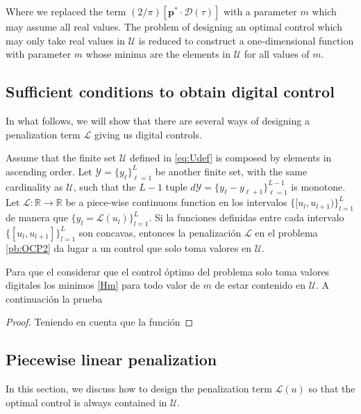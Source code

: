 Where we replaced the term $(2/\pi)[\bm{p}^* \cdot \bm{\mathcal{D}}(\tau)]$ with a parameter $m$ which may assume all real values. The problem of designing an optimal control which may only take real values in $\mathcal{U}$ is reduced to construct a one-dimensional function with parameter $m$ whose minima are the elements in $\mathcal{U}$ for all values of $m$.

\subsection{Sufficient conditions to obtain digital control}

In what follows, we will show that there are several ways of designing a penalization term $\mathcal L$ giving us digital controls.
\newline
\begin{theorem}
Assume that the finite set $\mathcal{U}$ defined in \eqref{eq:Udef} is composed by elements in ascending order. Let $\mathcal{Y} = \{y_\ell\}_{\ell=1}^L$ be another finite set, with the same cardinality as $\mathcal U$, such that the $L-1$ tuple $d\mathcal{Y} = \{y_\ell - y_{\ell+1}\}_{\ell=1}^{L-1}$ is monotone. Let $\mathcal{L}:\mathbb{R} \rightarrow \mathbb{R}$ be a piece-wise continuous function en los intervalos $\{ [u_l,u_{l+1})\}_{l=1}^L$ de manera que $\{y_l = \mathcal{L}(u_l)\}_{l=1}^L$. Si la funciones definidas entre cada intervalo $\{[u_l,u_{l+1}]\}_{l=1}^L$ son concavas, entonces la penalización $\mathcal{L}$ en el problema \ref{pb:OCP2} da lugar a un control que solo toma valores en $\mathcal{U}$.
\end{theorem}
Para que el considerar que el control óptimo del problema solo toma valores digitales los minimos  \ref{Hm} para todo valor de $m$ de estar contenido en $\mathcal{U}$. A continuación la prueba
\newline

\begin{proof}
    Teniendo en cuenta que la función 
\end{proof}

\subsection{Piecewise linear penalization}

In this section, we discuss how to design the penalization term $\mathcal{L}(u)$ so that the optimal control is always contained in $\mathcal{U}$. 

